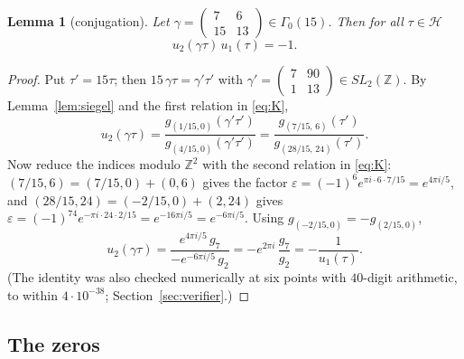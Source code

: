 \documentclass[pdflatex,sn-mathphys-num]{sn-jnl}
\theoremstyle{thmstyleone}%
\newtheorem{lemma}[theorem]{Lemma}%
\theoremstyle{thmstyletwo}%
\newcommand{\HH}{\mathcal{H}}
\begin{document}
\begin{lemma}[conjugation]\label{lem:conj}
Let $\gamma=\left(\begin{smallmatrix}7&6\\15&13\end{smallmatrix}\right)\in\Gamma_0(15)$. Then for all $\tau\in\HH$
\begin{equation}\label{eq:conj}
u_2(\gamma\tau)\,u_1(\tau)=-1 .
\end{equation}
\end{lemma}
\begin{proof}
Put $\tau'=15\tau$; then $15\,\gamma\tau=\gamma'\tau'$ with $\gamma'=\left(\begin{smallmatrix}7&90\\1&13\end{smallmatrix}\right)\in SL_2(\mathbb{Z})$. By Lemma~\ref{lem:siegel} and the first relation in \eqref{eq:K},
\[
u_2(\gamma\tau)=\frac{g_{(1/15,0)}(\gamma'\tau')}{g_{(4/15,0)}(\gamma'\tau')}
=\frac{g_{(7/15,\,6)}(\tau')}{g_{(28/15,\,24)}(\tau')}.
\]
Now reduce the indices modulo $\mathbb{Z}^2$ with the second relation in \eqref{eq:K}: $(7/15,6)=(7/15,0)+(0,6)$ gives the factor $\varepsilon=(-1)^{6}e^{\pi i\cdot 6\cdot 7/15}=e^{4\pi i/5}$, and $(28/15,24)=(-2/15,0)+(2,24)$ gives $\varepsilon=(-1)^{74}e^{-\pi i\cdot 24\cdot 2/15}=e^{-16\pi i/5}=e^{-6\pi i/5}$. Using $g_{(-2/15,0)}=-g_{(2/15,0)}$,
\[
u_2(\gamma\tau)=\frac{e^{4\pi i/5}\,g_7}{-e^{-6\pi i/5}\,g_2}=-e^{2\pi i}\,\frac{g_7}{g_2}=-\frac{1}{u_1(\tau)}.
\]
(The identity was also checked numerically at six points with $40$-digit arithmetic, to within $4\cdot10^{-38}$; Section~\ref{sec:verifier}.)
\end{proof}

\subsection{The zeros}
\end{document}
